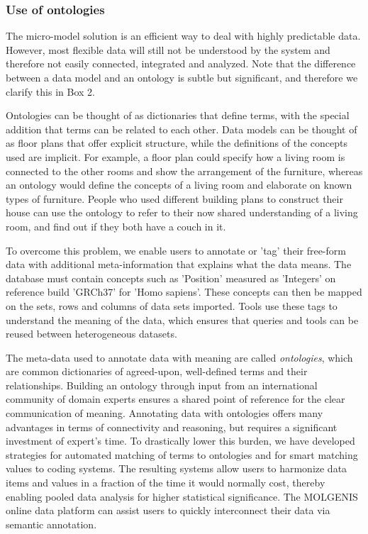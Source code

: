 \subsubsection*{Use of ontologies}

The micro-model solution is an efficient way to deal with highly predictable data.
However, most flexible data will still not be understood by the system and therefore not easily connected, integrated and analyzed.
Note that the difference between a data model and an ontology is subtle but significant, and therefore we clarify this in Box 2.

\begin{tcolorbox}[width=\textwidth,colframe=deeporange,colback={white},title={Box 2: Difference between data model and ontology},colbacktitle=white,coltitle=black,enhanced]
Ontologies can be thought of as dictionaries that define terms, with the special addition that terms can be related to each other.
Data models can be thought of as floor plans that offer explicit structure, while the definitions of the concepts used are implicit.
For example, a floor plan could specify how a living room is connected to the other rooms and show the arrangement of the furniture, whereas an ontology would define the concepts of a living room and elaborate on known types of furniture.
People who used different building plans to construct their house can use the ontology to refer to their now shared understanding of a living room, and find out if they both have a couch in it.
\end{tcolorbox}

To overcome this problem, we enable users to annotate or 'tag' their free-form data with additional meta-information that explains what the data means.
The database must contain concepts such as 'Position' measured as 'Integers' on reference build 'GRCh37' for 'Homo sapiens'.
These concepts can then be mapped on the sets, rows and columns of data sets imported.
Tools use these tags to understand the meaning of the data, which ensures that queries and tools can be reused between heterogeneous datasets.

The meta-data used to annotate data with meaning are called \textsl{ontologies}, which are common dictionaries of agreed-upon, well-defined terms and their relationships.
Building an ontology through input from an international community of domain experts ensures a shared point of reference for the clear communication of meaning.
Annotating data with ontologies offers many advantages in terms of connectivity and reasoning, but requires a significant investment of expert’s time.
To drastically lower this burden, we have developed strategies for automated matching of terms to ontologies\cite{Pang_2014} and for smart matching values to coding systems\cite{Pang_2015}.
The resulting systems allow users to harmonize data items and values in a fraction of the time it would normally cost, thereby enabling pooled data analysis for higher statistical significance.
The MOLGENIS online data platform can assist users to quickly interconnect their data via semantic annotation\cite{Pang_2015}.

